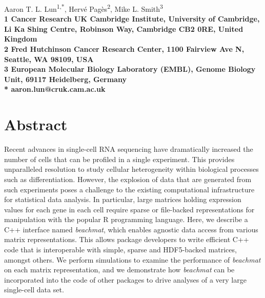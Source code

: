 \documentclass[10pt,letterpaper]{article}
\newcommand{\beachmat}{\textit{beachmat}}
\begin{document}
\vspace*{0.35in}

\begin{flushleft}
{\Large
    \textbf{}
}
\newline

Aaron T. L. Lun\textsuperscript{1,*},
Herv\'e Pag\`es\textsuperscript{2},
Mike L. Smith\textsuperscript{3}
\\
\bigskip
\bf{1} Cancer Research UK Cambridge Institute, University of Cambridge, Li Ka Shing Centre, Robinson Way, Cambridge CB2 0RE, United Kingdom \\
\bf{2} Fred Hutchinson Cancer Research Center, 1100 Fairview Ave N, Seattle, WA 98109, USA \\
\bf{3} European Molecular Biology Laboratory (EMBL), Genome Biology Unit, 69117 Heidelberg, Germany
\\
\bigskip
* aaron.lun@cruk.cam.ac.uk

\end{flushleft}

\section*{Abstract}
Recent advances in single-cell RNA sequencing have dramatically increased the number of cells that can be profiled in a single experiment.
This provides unparalleled resolution to study cellular heterogeneity within biological processes such as differentiation.
However, the explosion of data that are generated from such experiments poses a challenge to the existing computational infrastructure for statistical data analysis.
In particular, large matrices holding expression values for each gene in each cell require sparse or file-backed representations for manipulation with the popular R programming language.
Here, we describe a C++ interface named \beachmat{}, which enables agnostic data access from various matrix representations.
This allows package developers to write efficient C++ code that is interoperable with simple, sparse and HDF5-backed matrices, amongst others.
We perform simulations to examine the performance of \beachmat{} on each matrix representation, 
and we demonstrate how \beachmat{} can be incorporated into the code of other packages to drive analyses of a very large single-cell data set.
\end{document}

